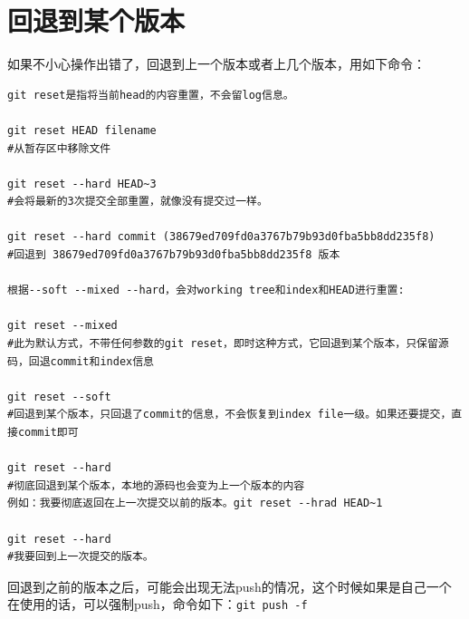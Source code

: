 \documentclass[a4paper,12pt]{ctexart}
\begin{document}
\section{回退到某个版本}
如果不小心操作出错了，回退到上一个版本或者上几个版本，用如下命令：
\begin{verbatim}
git reset是指将当前head的内容重置，不会留log信息。

git reset HEAD filename
#从暂存区中移除文件

git reset --hard HEAD~3
#会将最新的3次提交全部重置，就像没有提交过一样。

git reset --hard commit (38679ed709fd0a3767b79b93d0fba5bb8dd235f8)
#回退到 38679ed709fd0a3767b79b93d0fba5bb8dd235f8 版本

根据--soft --mixed --hard，会对working tree和index和HEAD进行重置:

git reset --mixed
#此为默认方式，不带任何参数的git reset，即时这种方式，它回退到某个版本，只保留源码，回退commit和index信息

git reset --soft
#回退到某个版本，只回退了commit的信息，不会恢复到index file一级。如果还要提交，直接commit即可

git reset --hard
#彻底回退到某个版本，本地的源码也会变为上一个版本的内容
例如：我要彻底返回在上一次提交以前的版本。git reset --hrad HEAD~1

git reset --hard
#我要回到上一次提交的版本。
\end{verbatim}
回退到之前的版本之后，可能会出现无法push的情况，这个时候如果是自己一个在使用的话，可以强制push，命令如下：\verb|git push -f|

\newpage
\end{document}
